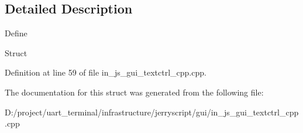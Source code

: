 \subsection{Detailed Description}
Define

Struct 

Definition at line 59 of file in\+\_\+js\+\_\+gui\+\_\+textctrl\+\_\+cpp.\+cpp.



The documentation for this struct was generated from the following file\+:\begin{DoxyCompactItemize}
\item 
D\+:/project/uart\+\_\+terminal/infrastructure/jerryscript/gui/in\+\_\+js\+\_\+gui\+\_\+textctrl\+\_\+cpp.\+cpp\end{DoxyCompactItemize}

